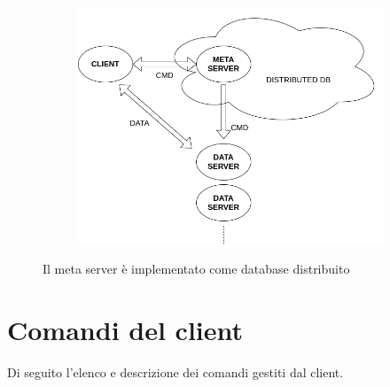 \documentclass{article}
\begin{document}
\begin{figure}[H]
	\centering
	\begin{subfigure}{0.80\linewidth}
		\includegraphics[width=\linewidth]{../diagrams/architettura/7.png}
	\end{subfigure}
	\caption{Il meta server è implementato come database distribuito}
\end{figure}



\section{Comandi del client}

Di seguito l'elenco e descrizione dei comandi gestiti dal client.
\end{document}
